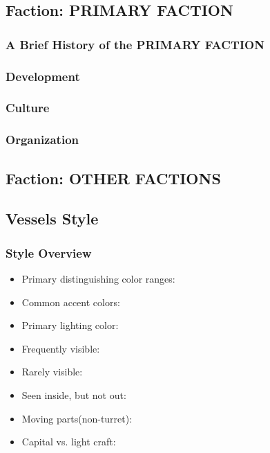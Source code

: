 \subsection{Faction: PRIMARY FACTION}

\subsubsection{A Brief History of the PRIMARY FACTION}


\subsubsection{Development}

\subsubsection{Culture}

\subsubsection{Organization}

\subsection{Faction: OTHER FACTIONS}

\subsection{Vessels Style}

\subsubsection{Style Overview}
\begin{itemize}

\item Primary distinguishing color ranges: 
\item Common accent colors:
\item Primary lighting color:
\item Frequently visible: 
\item Rarely visible:
\item Seen inside, but not out: 
\item Moving parts(non-turret): 
\item Capital vs. light craft: 
\end{itemize}


